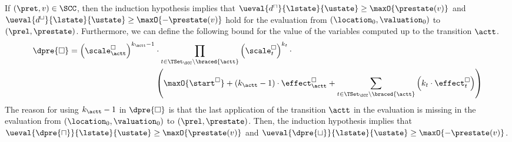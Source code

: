 If $(\pret, v) \in \SCC$, then the induction hypothesis implies that $\ueval{d^\sqcap}{\lstate}{\ustate} \geq \maxO{\prestate(v)}$ and $\ueval{d^\sqcup}{\lstate}{\ustate} \geq \maxO{-\prestate(v)}$ hold for the evaluation from $(\location_0, \valuation_0)$ to $(\prel, \prestate)$.
Furthermore, we can define the following bound for the value of the variables computed up to the transition $\actt$.
\begin{equation} \label{eq:induction_consequence}
  \begin{split}
  \dpre{\square} = \left( \scale^\square_\actt \right) ^{k_\actt - 1} &\cdot \prod_{t \in \TSet_\SCC \setminus \braced{\actt}} \left( \scale^\square_t \right) ^{k_t} \cdot \\
  & \left( \maxO{\start^\square} + \left( k_\actt - 1 \right) \cdot \effect^\square_\actt + \sum_{t \in \TSet_\SCC \setminus \braced{\actt}} \left( k_t \cdot \effect^\square_t \right) \right)
  \end{split}
\end{equation}
The reason for using $k_\actt - 1$ in $\dpre{\square}$ is that the last application of the transition $\actt$ in the evaluation is missing in the evaluation from $(\location_0, \valuation_0)$ to $(\prel, \prestate)$.
Then, the induction hypothesis implies that $\ueval{\dpre{\sqcap}}{\lstate}{\ustate} \geq \maxO{\prestate(v)}$ and $\ueval{\dpre{\sqcup}}{\lstate}{\ustate} \geq \maxO{-\prestate(v)}$.

